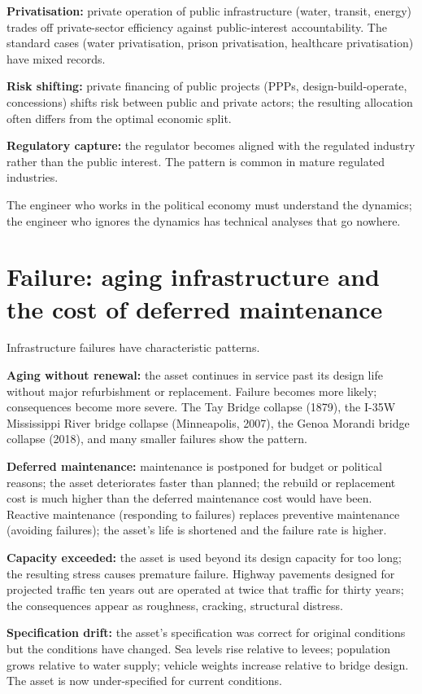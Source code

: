 \textbf{Privatisation:} private operation of public infrastructure (water, transit, energy) trades off private-sector efficiency against public-interest accountability. The standard cases (water privatisation, prison privatisation, healthcare privatisation) have mixed records.

\textbf{Risk shifting:} private financing of public projects (PPPs, design-build-operate, concessions) shifts risk between public and private actors; the resulting allocation often differs from the optimal economic split.

\textbf{Regulatory capture:} the regulator becomes aligned with the regulated industry rather than the public interest. The pattern is common in mature regulated industries.

The engineer who works in the political economy must understand the dynamics; the engineer who ignores the dynamics has technical analyses that go nowhere.

\section{Failure: aging infrastructure and the cost of deferred maintenance}

Infrastructure failures have characteristic patterns.

\textbf{Aging without renewal:} the asset continues in service past its design life without major refurbishment or replacement. Failure becomes more likely; consequences become more severe. The Tay Bridge collapse (1879), the I-35W Mississippi River bridge collapse (Minneapolis, 2007), the Genoa Morandi bridge collapse (2018), and many smaller failures show the pattern.

\textbf{Deferred maintenance:} maintenance is postponed for budget or political reasons; the asset deteriorates faster than planned; the rebuild or replacement cost is much higher than the deferred maintenance cost would have been. Reactive maintenance (responding to failures) replaces preventive maintenance (avoiding failures); the asset's life is shortened and the failure rate is higher.

\textbf{Capacity exceeded:} the asset is used beyond its design capacity for too long; the resulting stress causes premature failure. Highway pavements designed for projected traffic ten years out are operated at twice that traffic for thirty years; the consequences appear as roughness, cracking, structural distress.

\textbf{Specification drift:} the asset's specification was correct for original conditions but the conditions have changed. Sea levels rise relative to levees; population grows relative to water supply; vehicle weights increase relative to bridge design. The asset is now under-specified for current conditions.


